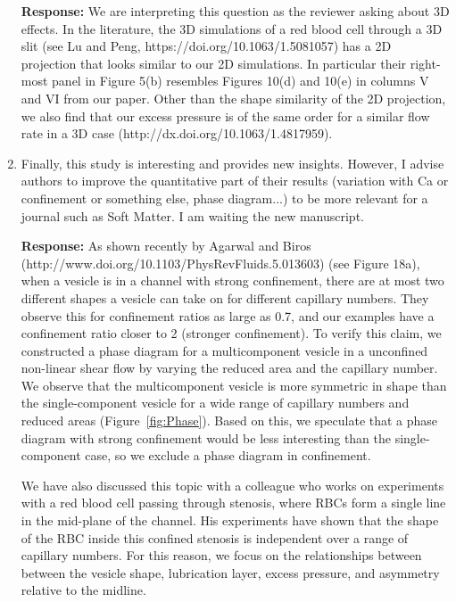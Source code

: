 \documentclass[11pt]{article}
\begin{document}
\begin{enumerate}
\noindent
{\bf Response:} We are interpreting this question as the reviewer asking
about 3D effects. In the literature, the 3D simulations of a red blood
cell through a 3D slit (see Lu and Peng,
https://doi.org/10.1063/1.5081057) has a 2D projection that looks
similar to our 2D simulations. In particular their right-most panel in
Figure 5(b) resembles Figures 10(d) and 10(e) in columns V and VI from
our paper. Other than the shape similarity of the 2D projection, we also
find that our excess pressure is of the same order for a similar flow
rate in a 3D case (http://dx.doi.org/10.1063/1.4817959).

\item Finally, this study is interesting and provides new insights.
  However, I advise authors to improve the quantitative part of their
  results (variation with Ca or confinement or something else, phase
  diagram...) to be more relevant for a journal such as Soft Matter. I
  am waiting the new manuscript.

\noindent
{\bf Response:} As shown recently by Agarwal and Biros
(http://www.doi.org/10.1103/PhysRevFluids.5.013603) (see Figure 18a),
when a vesicle is in a channel with strong confinement, there are at
most two different shapes a vesicle can take on for different capillary
numbers. They observe this for confinement ratios as large as 0.7, and
our examples have a confinement ratio closer to 2 (stronger
confinement). To verify this claim, we constructed a phase diagram for a
multicomponent vesicle in a unconfined non-linear shear flow by varying
the reduced area and the capillary number. We observe that the
multicomponent vesicle is more symmetric in shape than the
single-component vesicle for a wide range of capillary numbers and
reduced areas (Figure~\ref{fig:Phase}). Based on this, we speculate that
a phase diagram with strong confinement would be less interesting than
the single-component case, so we exclude a phase diagram in confinement.
%

We have also discussed this topic with a colleague who works on
experiments with a red blood cell passing through stenosis, where RBCs
form a single line in the mid-plane of the channel. His experiments have
shown that the shape of the RBC inside this confined stenosis is
independent over a range of capillary numbers. For this reason, we focus
on the relationships between between the vesicle shape, lubrication
layer, excess pressure, and asymmetry relative to the midline.


\end{enumerate}
\end{document}
